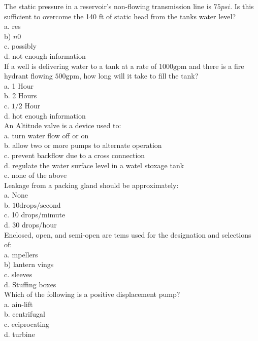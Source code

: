 The static pressure in a reservoir's non-flowing transmission line is $75psi$. Is this sufficient to overcome the 140 ft of static head from the tanks water level?\\
a. res\\
b) $n 0$\\
c. possibly\\
d. not enough information\\

If a well is delivering water to a tank at a rate of $1000 \mathrm{gpm}$ and there is a fire hydrant flowing $500 \mathrm{gpm}$, how long will it take to fill the tank?\\
a. 1 Hour\\
b. 2 Hours\\
c. $1 / 2$ Hour\\
d.  hot enough information\\

An Altitude valve is a device used to:\\
a. turn water flow off or on\\
b. allow two or more pumps to alternate operation\\
c. prevent backflow due to a cross connection\\
d. regulate the water surface level in a watel stoxage tank\\
e. none of the above\\

Leakage from a packing gland should be approximately:\\
a. None\\
b. $10 \mathrm{drops} / \mathrm{second}$\\
c. 10 drops/mimute\\
d. 30 drops/hour\\

Enclosed, open, and semi-open are tems used for the designation and selections of:\\
a. mpellers\\
b) lantern vings\\
c. sleeves\\
d. Stuffing boxes\\

Which of the following is a positive displacement pump?\\
a. ain-lift\\
b. centrifugal\\
c. eciprocating\\
d. turbine\\

